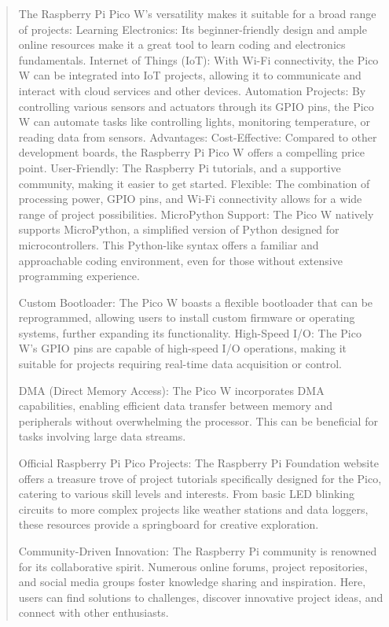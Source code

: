 \documentclass[12pt]{report}
\begin{document}
\begin{quote}
				The Raspberry Pi Pico W's versatility makes it suitable for a broad range of projects:
				Learning Electronics: Its beginner-friendly design and ample online resources make it a great tool to learn coding and electronics fundamentals.
				Internet of Things (IoT): With Wi-Fi connectivity, the Pico W can be integrated into IoT projects, allowing it to communicate and interact with cloud services and other devices.
				Automation Projects: By controlling various sensors and actuators through its GPIO pins, the Pico W can automate tasks like controlling lights, monitoring temperature, or reading data from sensors.
				Advantages:
				Cost-Effective: Compared to other development boards, the Raspberry Pi Pico W offers a compelling price point.
				User-Friendly: The Raspberry Pi tutorials, and a supportive community, making it easier to get started.
				Flexible: The combination of processing power, GPIO pins, and Wi-Fi connectivity allows for a wide range of project possibilities.
				MicroPython Support: The Pico W natively supports MicroPython, a simplified version of Python designed for microcontrollers. This Python-like syntax offers a familiar and approachable coding environment, even for those without extensive programming experience.
				
				Custom Bootloader: The Pico W boasts a flexible bootloader that can be reprogrammed, allowing users to install custom firmware or operating systems, further expanding its functionality.
				High-Speed I/O: The Pico W's GPIO pins are capable of high-speed I/O operations, making it suitable for projects requiring real-time data acquisition or control.
				
				DMA (Direct Memory Access): The Pico W incorporates DMA capabilities, enabling efficient data transfer between memory and peripherals without overwhelming the processor. This can be beneficial for tasks involving large data streams.
				
				Official Raspberry Pi Pico Projects: The Raspberry Pi Foundation website offers a treasure trove of project tutorials specifically designed for the Pico, catering to various skill levels and interests. From basic LED blinking circuits to more complex projects like weather stations and data loggers, these resources provide a springboard for creative exploration.
				
				Community-Driven Innovation: The Raspberry Pi community is renowned for its collaborative spirit. Numerous online forums, project repositories, and social media groups foster knowledge sharing and inspiration. Here, users can find solutions to challenges, discover innovative project ideas, and connect with other enthusiasts.
				

\end{quote}
\end{document}
